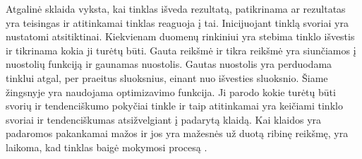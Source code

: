\documentclass{VUMIFInfKursinis}
\begin{document}
Atgalinė sklaida vyksta, kai tinklas išveda rezultatą, patikrinama ar
rezultatas yra teisingas ir atitinkamai tinklas reaguoja į tai. Inicijuojant tinklą svoriai yra
nustatomi atsitiktinai. Kiekvienam duomenų rinkiniui yra stebima tinklo išvestis ir tikrinama kokia
ji turėtų būti. Gauta reikšmė ir tikra reikšmė yra siunčiamos į nuostolių funkciją ir gaunamas nuostolis. Gautas nuostolis yra perduodama tinklui atgal, per praeitus sluoksnius, einant nuo
išvesties sluoksnio. Šiame žingsnyje yra naudojama optimizavimo funkcija. Ji parodo kokie turėtų būti
svorių ir tendenciškumo pokyčiai tinkle ir taip atitinkamai yra
keičiami tinklo svoriai ir tendenciškumas atsižvelgiant į padarytą klaidą. Kai klaidos
yra padaromos pakankamai mažos ir jos yra mažesnės už duotą ribinę reikšmę, yra laikoma, kad tinklas
baigė mokymosi procesą \cite{salt3}.
\end{document}
